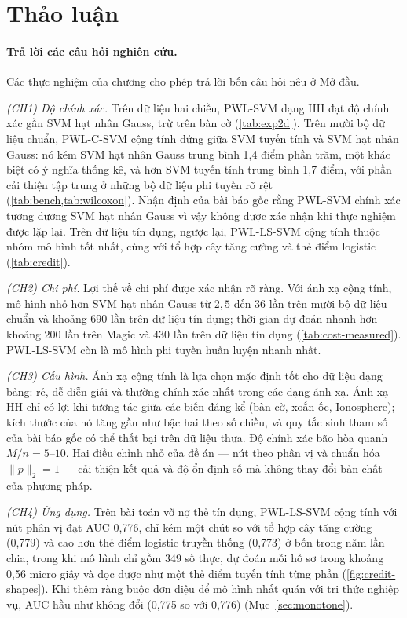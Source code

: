 \section{Thảo luận}\label{sec:discussion}

\paragraph{Trả lời các câu hỏi nghiên cứu.} Các thực nghiệm của chương cho phép trả lời bốn câu hỏi nêu ở Mở đầu.

\emph{(CH1) Độ chính xác.} Trên dữ liệu hai chiều, PWL-SVM dạng HH đạt độ chính xác gần SVM hạt nhân Gauss, trừ trên bàn cờ (\cref{tab:exp2d}). Trên mười bộ dữ liệu chuẩn, PWL-C-SVM cộng tính đứng giữa SVM tuyến tính và SVM hạt nhân Gauss: nó kém SVM hạt nhân Gauss trung bình 1{,}4 điểm phần trăm, một khác biệt có ý nghĩa thống kê, và hơn SVM tuyến tính trung bình 1{,}7 điểm, với phần cải thiện tập trung ở những bộ dữ liệu phi tuyến rõ rệt (\cref{tab:bench,tab:wilcoxon}). Nhận định của bài báo gốc rằng PWL-SVM chính xác tương đương SVM hạt nhân Gauss vì vậy không được xác nhận khi thực nghiệm được lặp lại. Trên dữ liệu tín dụng, ngược lại, PWL-LS-SVM cộng tính thuộc nhóm mô hình tốt nhất, cùng với tổ hợp cây tăng cường và thẻ điểm logistic (\cref{tab:credit}).

\emph{(CH2) Chi phí.} Lợi thế về chi phí được xác nhận rõ ràng. Với ánh xạ cộng tính, mô hình nhỏ hơn SVM hạt nhân Gauss từ $2{,}5$ đến $36$ lần trên mười bộ dữ liệu chuẩn và khoảng 690 lần trên dữ liệu tín dụng; thời gian dự đoán nhanh hơn khoảng 200 lần trên Magic và 430 lần trên dữ liệu tín dụng (\cref{tab:cost-measured}). PWL-LS-SVM còn là mô hình phi tuyến huấn luyện nhanh nhất.

\emph{(CH3) Cấu hình.} Ánh xạ cộng tính là lựa chọn mặc định tốt cho dữ liệu dạng bảng: rẻ, dễ diễn giải và thường chính xác nhất trong các dạng ánh xạ. Ánh xạ HH chỉ có lợi khi tương tác giữa các biến đáng kể (bàn cờ, xoắn ốc, Ionosphere); kích thước của nó tăng gần như bậc hai theo số chiều, và quy tắc sinh tham số của bài báo gốc có thể thất bại trên dữ liệu thưa. Độ chính xác bão hòa quanh $M/n=5$--$10$. Hai điều chỉnh nhỏ của đề án --- nút theo phân vị và chuẩn hóa $\|p\|_2=1$ --- cải thiện kết quả và độ ổn định số mà không thay đổi bản chất của phương pháp.

\emph{(CH4) Ứng dụng.} Trên bài toán vỡ nợ thẻ tín dụng, PWL-LS-SVM cộng tính với nút phân vị đạt AUC 0{,}776, chỉ kém một chút so với tổ hợp cây tăng cường (0{,}779) và cao hơn thẻ điểm logistic truyền thống (0{,}773) ở bốn trong năm lần chia, trong khi mô hình chỉ gồm 349 số thực, dự đoán mỗi hồ sơ trong khoảng 0{,}56 micro giây và đọc được như một thẻ điểm tuyến tính từng phần (\cref{fig:credit-shapes}). Khi thêm ràng buộc đơn điệu để mô hình nhất quán với tri thức nghiệp vụ, AUC hầu như không đổi (0{,}775 so với 0{,}776) (Mục~\ref{sec:monotone}).


